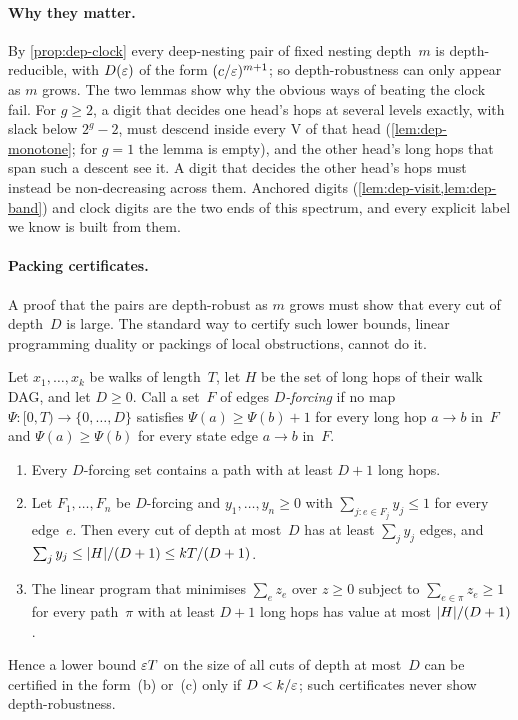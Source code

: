 \paragraph{Why they matter.} By \cref{prop:dep-clock} every deep-nesting pair of fixed nesting depth~$m$ is depth-reducible,
with $D(\varepsilon)$ of the form $(c/\varepsilon)^{m+1}$; so depth-robustness can only appear as $m$ grows. The two lemmas show why
the obvious ways of beating the clock fail. For $g\ge2$, a digit that decides one head's hops at several levels exactly,
with slack below $2^g-2$, must descend inside every V of that head (\cref{lem:dep-monotone}; for $g=1$ the lemma is
empty), and the other head's long
hops that span such a descent see it. A digit that decides the other head's hops must instead be non-decreasing across
them. Anchored digits (\cref{lem:dep-visit,lem:dep-band}) and clock digits are the two ends of this spectrum, and
every explicit label we know is built from them.

\paragraph{Packing certificates.} A proof that the pairs are depth-robust as $m$ grows must show that every cut of depth~$D$ is
large. The standard way to certify such lower bounds, linear programming duality or packings of local obstructions,
cannot do it.

\begin{proposition}\label{prop:packing}
\notformalized
Let $x_1,\dots,x_k$ be walks of length~$T$, let $H$ be the set of long hops of their walk DAG, and let $D\ge0$. Call a
set~$F$ of edges \emph{$D$-forcing} if no map $\Psi\colon[0,T)\to\{0,\dots,D\}$ satisfies $\Psi(a)\ge\Psi(b)+1$ for
every long hop $a\to b$ in~$F$ and $\Psi(a)\ge\Psi(b)$ for every state edge $a\to b$ in~$F$.
\begin{enumerate}[label=(\alph*)]
\item Every $D$-forcing set contains a path with at least $D+1$ long hops.
\item Let $F_1,\dots,F_n$ be $D$-forcing and $y_1,\dots,y_n\ge0$ with $\sum_{j:e\in F_j}y_j\le1$ for every edge~$e$.
Then every cut of depth at most~$D$ has at least $\sum_jy_j$ edges, and $\sum_jy_j\le\lvert H \rvert/(D+1)\le kT/(D+1)$.
\item The linear program that minimises $\sum_ez_e$ over $z\ge0$ subject to $\sum_{e\in\pi}z_e\ge1$ for every path~$\pi$
with at least $D+1$ long hops has value at most $\lvert H \rvert/(D+1)$.
\end{enumerate}
Hence a lower bound $\varepsilon T$ on the size of all cuts of depth at most~$D$ can be certified in the form~(b) or~(c) only
if $D<k/\varepsilon$; such certificates never show depth-robustness.
\end{proposition}

